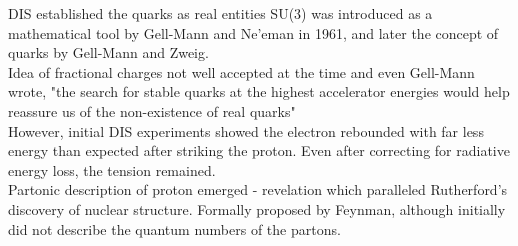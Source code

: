 \documentclass[svgnames]{beamer}
\begin{document}
\begin{frame}{DIS established the quarks as real entities}
    SU(3) was introduced as a mathematical tool by Gell-Mann and Ne'eman in 1961, and later the concept of quarks by Gell-Mann and Zweig. \bigskip\\

    Idea of fractional charges not well accepted at the time and even Gell-Mann wrote, "the search for stable quarks at the highest accelerator energies would help reassure us of the non-existence of real quarks" \bigskip\\

    However, initial DIS experiments showed the electron rebounded with far less energy than expected after striking the proton. Even after correcting for radiative energy loss, the tension remained. \bigskip \\

   Partonic description of proton emerged - revelation which paralleled Rutherford's discovery of nuclear structure. Formally proposed by Feynman, although initially did not describe the quantum numbers of the partons. 

\end{frame}
\end{document}
